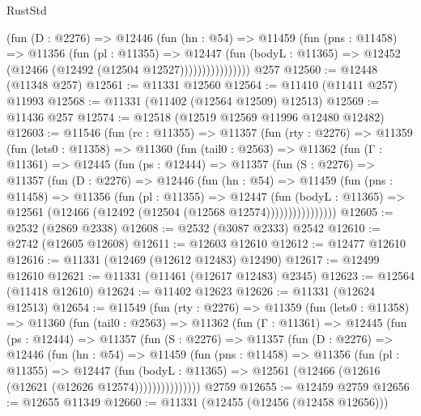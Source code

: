 \begin{lexlean}{RustStd}
\begin{coremodule}
                    (fun (D : @2276) =>
                    @12446
                      (fun (hn : @54) =>
                      @11459
                        (fun (pns : @11458) =>
                        @11356
                          (fun (pl : @11355) =>
                          @12447
                            (fun (bodyL : @11365) =>
                            @12452 (@12466 (@12492 (@12504 @12527))))))))))))))))
    @257
@12560 := @12448 (@11348 @257)
@12561 := @11331 @12560
@12564 := @11410 (@11411 @257) @11993
@12568 := @11331 (@11402 (@12564 @12509) @12513)
@12569 := @11436 @257
@12574 := @12518 (@12519 @12569 @11996 @12480 @12482)
@12603 := @11546
    (fun (rc : @11355) =>
    @11357
      (fun (rty : @2276) =>
      @11359
        (fun (lets0 : @11358) =>
        @11360
          (fun (tail0 : @2563) =>
          @11362
            (fun (Γ : @11361) =>
            @12445
              (fun (ps : @12444) =>
              @11357
                (fun (S : @2276) =>
                @11357
                  (fun (D : @2276) =>
                  @12446
                    (fun (hn : @54) =>
                    @11459
                      (fun (pns : @11458) =>
                      @11356
                        (fun (pl : @11355) =>
                        @12447
                          (fun (bodyL : @11365) =>
                          @12561 (@12466 (@12492 (@12504 (@12568 @12574))))))))))))))))
@12605 := @2532 (@2869 @2338)
@12608 := @2532 (@3087 @2333) @2542
@12610 := @2742 (@12605 @12608)
@12611 := @12603 @12610
@12612 := @12477 @12610
@12616 := @11331 (@12469 (@12612 @12483) @12490)
@12617 := @12499 @12610
@12621 := @11331 (@11461 (@12617 @12483) @2345)
@12623 := @12564 (@11418 @12610)
@12624 := @11402 @12623
@12626 := @11331 (@12624 @12513)
@12654 := @11549
    (fun (rty : @2276) =>
    @11359
      (fun (lets0 : @11358) =>
      @11360
        (fun (tail0 : @2563) =>
        @11362
          (fun (Γ : @11361) =>
          @12445
            (fun (ps : @12444) =>
            @11357
              (fun (S : @2276) =>
              @11357
                (fun (D : @2276) =>
                @12446
                  (fun (hn : @54) =>
                  @11459
                    (fun (pns : @11458) =>
                    @11356
                      (fun (pl : @11355) =>
                      @12447
                        (fun (bodyL : @11365) =>
                        @12561 (@12466 (@12616 (@12621 (@12626 @12574)))))))))))))))
    @2759
@12655 := @12459 @2759
@12656 := @12655 @11349
@12660 := @11331 (@12455 (@12456 (@12458 @12656)))

\end{coremodule}
\end{lexlean}
